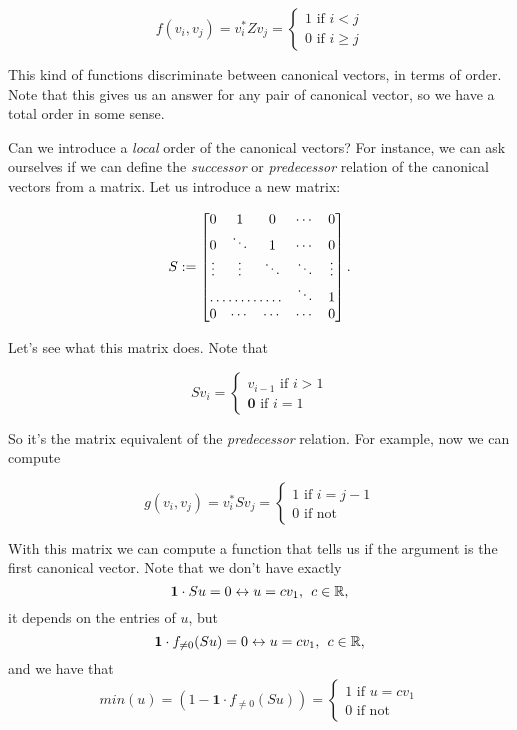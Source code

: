 \[
  			f(v_i, v_j)=v_i^*Zv_j=\begin{cases}
               1 \text{ if } i < j \\
               0 \text{ if } i \geq j
            \end{cases}
		\]
		
This kind of functions discriminate between canonical vectors, in terms of order. Note that this gives us an answer for any pair of canonical vector, so we have a total order in some sense.

Can we introduce a \textit{local} order of the canonical vectors? For instance, we can ask ourselves if we can define the \textit{successor} or \textit{predecessor} relation of the canonical vectors from a matrix. Let us introduce a new matrix:

\[
S := \begin{bmatrix}
    0 & 1         & 0         & \cdots &  0 \\
    0 & \ddots & 1         & \cdots & 0 \\
    \vdots & \vdots & \ddots & \ddots & \vdots \\
    \hdotsfor{3} & \ddots & 1 \\
    0 & \cdots & \cdots & \cdots & 0 
\end{bmatrix}.
\]

Let's see what this matrix does. Note that

\[
  			Sv_i=\begin{cases}
               v_{i-1} \text{ if } i > 1 \\
              \mathbf{0} \text{ if } i = 1
            \end{cases}
		\]

So it's the matrix equivalent of the \textit{predecessor} relation. For example, now we can compute 

\[
  			g(v_i, v_j)=v_i^*Sv_j=\begin{cases}
               1 \text{ if } i = j - 1 \\
               0 \text{ if not}
            \end{cases}
		\]
		
With this matrix we can compute a function that tells us if the argument is the first canonical vector. Note that we don't have exactly $$\mathbf{1}\cdot Su=0\leftrightarrow u=cv_1, \hspace{1ex} c\in\mathbb{R},$$ it depends on the entries of $u$, but  $$\mathbf{1}\cdot f_{\neq 0}(Su)=0\leftrightarrow u=cv_1, \hspace{1ex} c\in\mathbb{R},$$ and we have that
\[
  			min(u)=(1-\mathbf{1}\cdot f_{\neq 0}(Su))=\begin{cases}
               1 \text{ if } u = cv_1 \\
               0 \text{ if not}
            \end{cases}
		\]


